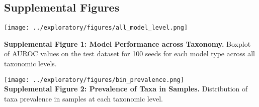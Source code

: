 \documentclass[
]{article}
\begin{document}
\newpage

\hypertarget{supplemental-figures}{%
\subsection{Supplemental Figures}\label{supplemental-figures}}

\texttt{[image: ../exploratory/figures/all\_model\_level.png]}

\textbf{Supplemental Figure 1: Model Performance across Taxonomy.}
Boxplot of AUROC values on the test dataset for 100 seeds for each model
type across all taxonomic levels.

\texttt{[image: ../exploratory/figures/bin\_prevalence.png]}\\
\textbf{Supplemental Figure 2: Prevalence of Taxa in Samples.}
Distribution of taxa prevalence in samples at each taxonomic level.
\end{document}
